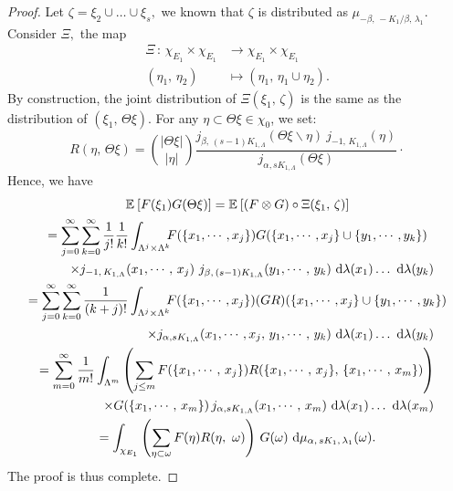\documentclass[11pt,a4paper]{amsart}
\begin{document}
\begin{proof}
  Let $\zeta=\xi_2\cup\ldots\cup\xi_s,$ we known that $\zeta$ is
  distributed as $\mu_{-\beta, \, - K_1/\beta,\, \lambda_1}.$ Consider
  $\Xi,$ the map
  \begin{align*}
    \Xi \, :\, \chi_{E_1}\times \chi_{E_1} & \longrightarrow
    \chi_{E_1}\times \chi_{E_1}\\
    (\eta_1,\, \eta_2) &\longmapsto (\eta_1, \, \eta_1\cup \eta_2).
  \end{align*}
  By construction, the joint distribution of $\Xi(\xi_1,\, \zeta)$ is
  the same as the distribution of $(\xi_1,\, \Theta\xi)$. For any
  $\eta\subset \Theta\xi\in \chi_0$, we set:
  \begin{equation*}
    R(\eta,\, \Theta\xi)=\binom{|\Theta\xi|}{|\eta|} \frac{j_{\beta,\,
        (s-1)K_{1,\Lambda}}(\Theta\xi\backslash \eta)\   j_{-1,\,
        K_{1,\Lambda}}(\eta)}{j_{\alpha, sK_{1,\Lambda}}(\Theta\xi)}\cdotp
  \end{equation*}
  Hence, we have
  \begin{multline*}
    {{\mathbb E}_{{}}\left[{{F(\xi_1)G(\Theta\xi)}}\right]} ={{\mathbb E}_{{}}\left[{{(F\otimes G)\circ
      \Xi(\xi_1,\,
      \zeta)}}\right]}\\
    = \sum_{j=0}^\infty\sum_{k=0}^\infty
    \frac{1}{j!}\frac{1}{k!}\int_{\Lambda^j\times \Lambda^k}
    \kern-5pt  F(\{x_1,\cdots, x_j\})G(\{x_1,\cdots, x_j\}\cup\{y_1,\cdots,y_k\})\\
    \shoveright{ \times j_{-1,\, K_{1,\Lambda}}(x_1,\cdots, \, x_j)\
      j_{\beta,\,  (s-1)K_{1,\Lambda}}(y_1,\cdots,\,y_k){\text{ d}}\lambda(x_1)\ldots{\text{ d}}\lambda(y_k)}\\
    = \sum_{j=0}^\infty\sum_{k=0}^\infty
    \frac{1}{(k+j)!}\int_{\Lambda^j\times \Lambda^k}
    \kern-5pt F(\{x_1,\cdots, x_j\})(GR)(\{x_1,\cdots, x_j\}\cup\{y_1,\cdots,y_k\})\\
    
    \shoveright{ \times j_{\alpha, sK_{1,\Lambda}}(x_1,\cdots, x_j
      ,\,y_1,\cdots,\,y_k){\text{ d}}\lambda(x_1)\ldots{\text{ d}}\lambda(y_k)}\\
    \shoveleft{= \sum_{m=0}^\infty \frac{1}{m!}\int_{\Lambda^m}
      \left(\sum_{j\le m}
        F(\{x_1,\cdots,\, x_j\})R(\{x_1,\cdots,\, x_j\},\, \{x_1,\cdots,\, x_m\}) \right)}\\
    \shoveright{\times G(\{x_1,\cdots,\, x_m\})\, j_{\alpha,
        sK_{1,\Lambda}}(x_1,\cdots,\, x_m)
      {\text{ d}}\lambda(x_1)\ldots{\text{ d}}\lambda(x_m)}\\
    =\int_{\chi_{E_1}} \left(\sum_{\eta\subset \omega} F(\eta)
      R(\eta,\ \omega) \right)\, G(\omega){\text{ d}}\mu_{\alpha,\, sK_1,\,
      \lambda_1}(\omega).
  \end{multline*}
  The proof is thus complete.
\end{proof}
\end{document}

